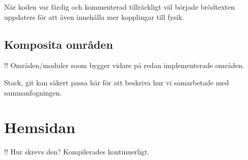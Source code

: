 \begin{binge}
När koden var färdig och kommenterad tillräckligt väl började brödtexten
uppdaters för att även innehålla mer kopplingar till fysik.

\subsection{Komposita områden}
!! Områden/moduler soom bygger vidare på redan implementerade områden.

Stack, git kan säkert passa här för att beskriva hur vi samarbetade med sammanfogningen.

\section{Hemsidan}

!! Hur skrevs den?
Kompilerades kontinuerligt.

\end{binge}
